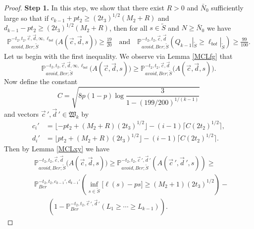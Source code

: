 \begin{proof}
	{\bf \raggedleft Step 1.} In this step, we show that there exist $R > 0$ and $\bar{N}_0$ sufficiently large so that if $c_{k-1} + pt_2 \geq (2t_3)^{1/2} (M_2 + R)$ and $d_{k-1} - pt_2 \geq (2t_3)^{1/2} (M_2 + R)$, then for all $s\in\tilde{S}$ and $N\geq\bar{N}_0$ we have
	\begin{equation}\label{6.2step1}
	\begin{split}
	\mathbb{P}^{-t_2,t_2,\vec{c},\vec{d},\infty,\ell_{bot}}_{avoid,Ber; \tilde S}\big(A(\vec{c},\vec{d},s)\big) \geq  \frac{19}{20} \quad \mathrm{and} \quad \mathbb{P}^{-t_2,t_2,\vec{c},\vec{d}}_{avoid,Ber;\tilde S}\left(Q_{k-1}|_{\tilde S} \geq \ell_{bot}|_{\tilde S}\right) \geq \frac{99}{100}.
	\end{split}
	\end{equation} 
	Let us begin with the first inequality. We observe via Lemma \ref{MCLfg} that
	\begin{equation}\label{6.2step1MC}
	\mathbb{P}^{-t_2,t_2,\vec{c},\vec{d},\infty,\ell_{bot}}_{avoid,Ber; \tilde S}\big(A(\vec{c},\vec{d},s)\big) \geq \mathbb{P}^{-t_2,t_2,\vec{c},\vec{d}}_{avoid,Ber; \tilde S}\big(A(\vec{c},\vec{d},s)\big).
	\end{equation}
	Now define the constant
	\begin{equation}\label{6.2C}
	C = \sqrt{8p(1-p)\log\frac{3}{1-(199/200)^{1/(k-1)}}}
	\end{equation}
	and vectors $\vec{c}\,', \vec{d}\,' \in \mathfrak{W}_k$ by
	\begin{align*}
	c_i' &= \lfloor -pt_2 + (M_2+R)(2t_3)^{1/2}\rfloor - (i-1)\lceil C(2t_2)^{1/2}\rceil,\\
	d_i' &= \lfloor pt_2 + (M_2+R)(2t_3)^{1/2}\rfloor - (i-1)\lceil C(2t_2)^{1/2}\rceil.
	\end{align*}
	Then by Lemma \ref{MCLxy} we have
	\begin{equation}\label{6.2step1split}
	\begin{split}
	&\mathbb{P}^{-t_2,t_2,\vec{c},\vec{d}}_{avoid,Ber; \tilde S}\big(A(\vec{c},\vec{d},s)\big) \geq \mathbb{P}^{-t_2, t_2, \vec{c}\,', \vec{d}\,'}_{avoid, Ber; \tilde S}(A(\vec{c}\,', \vec{d}\,',s)) \geq \\ 
	&\mathbb{P}^{-t_2, t_2, c_{k-1}', d_{k-1}'}_{Ber}\left(\inf_{s\in \tilde S}\big[\ell(s) - ps\big] \geq (M_2+1)(2t_3)^{1/2}\right) - \\
	&\qquad \left( 1 - \mathbb{P}^{-t_2, t_2, \vec{c}\,', \vec{d}\,'}_{Ber}\left(L_1 \geq \cdots \geq L_{k-1}\right)\right).
	\end{split}
	\end{equation}

\end{proof}
